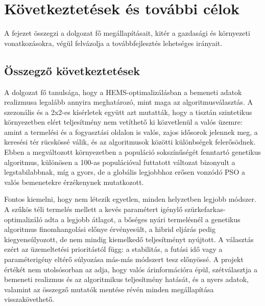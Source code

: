 \chapter{Következtetések és további célok}\label{ch:ZARSZO}

\begin{osszefoglal}
A fejezet összegzi a dolgozat fő megállapításait, kitér a gazdasági és környezeti vonatkozásokra, végül felvázolja a továbbfejlesztés lehetséges irányait.
\end{osszefoglal}

\section{Összegző következtetések}
A dolgozat fő tanulsága, hogy a HEMS-optimalizálásban a bemeneti adatok realizmusa legalább annyira meghatározó, mint maga az algoritmusválasztás. A szezonális és a 2x2-es kísérletek együtt azt mutatták, hogy a tisztán szintetikus környezetben elért teljesítmény nem vetíthető ki közvetlenül a valós üzemre: amint a termelési és a fogyasztási oldalon is valós, zajos idősorok jelennek meg, a keresési tér rücskössé válik, és az algoritmusok közötti különbségek felerősödnek. Ebben a megváltozott környezetben a populáció sokszínűségét fenntartó genetikus algoritmus, különösen a 100-as populációval futtatott változat bizonyult a legstabilabbnak, míg a gyors, de a globális legjobbhoz erősen vonzódó PSO a valós bemenetekre érzékenynek mutatkozott.

Fontos kiemelni, hogy nem létezik egyetlen, minden helyzetben legjobb módszer. A szűkös téli termelés mellett a kevés paramétert igénylő szürkefarkas-optimalizáló adta a legjobb átlagot, a bőséges nyári termelésnél a genetikus algoritmus finomhangolási előnye érvényesült, a hibrid eljárás pedig kiegyensúlyozott, de nem mindig kiemelkedő teljesítményt nyújtott. A választás ezért az üzemeltetési prioritástól függ: a stabilitás, a futási idő vagy a paraméterigény eltérő súlyozása más-más módszert tesz előnyössé. A projekt értékét nem utolsósorban az adja, hogy valós árinformációra épül, szétválasztja a bemeneti realizmus és az algoritmikus teljesítmény hatását, és a nyers adatok, valamint az összegző mutatók mentése révén minden megállapítása visszakövethető.

